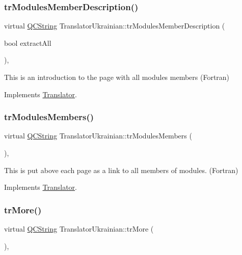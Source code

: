 \subsubsection{\texorpdfstring{trModulesMemberDescription()}{trModulesMemberDescription()}}
{\footnotesize\ttfamily virtual \mbox{\hyperlink{class_q_c_string}{Q\+C\+String}} Translator\+Ukrainian\+::tr\+Modules\+Member\+Description (\begin{DoxyParamCaption}\item[{bool}]{extract\+All }\end{DoxyParamCaption})\hspace{0.3cm}{\ttfamily [inline]}, {\ttfamily [virtual]}}

This is an introduction to the page with all modules members (Fortran) 

Implements \mbox{\hyperlink{class_translator}{Translator}}.

\mbox{\label{class_translator_ukrainian_a0bac7428a603fb52734b7418ff052c0d}} 
\subsubsection{\texorpdfstring{trModulesMembers()}{trModulesMembers()}}
{\footnotesize\ttfamily virtual \mbox{\hyperlink{class_q_c_string}{Q\+C\+String}} Translator\+Ukrainian\+::tr\+Modules\+Members (\begin{DoxyParamCaption}{ }\end{DoxyParamCaption})\hspace{0.3cm}{\ttfamily [inline]}, {\ttfamily [virtual]}}

This is put above each page as a link to all members of modules. (Fortran) 

Implements \mbox{\hyperlink{class_translator}{Translator}}.

\mbox{\label{class_translator_ukrainian_a51c2104453e25b9f510e4877ae46627f}} 
\subsubsection{\texorpdfstring{trMore()}{trMore()}}
{\footnotesize\ttfamily virtual \mbox{\hyperlink{class_q_c_string}{Q\+C\+String}} Translator\+Ukrainian\+::tr\+More (\begin{DoxyParamCaption}{ }\end{DoxyParamCaption})\hspace{0.3cm}{\ttfamily [inline]}, {\ttfamily [virtual]}}


